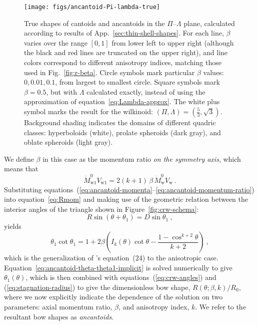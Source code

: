 \documentclass[useAMS, usenatbib, a4paper]{mnras}
\newcommand\w{\ensuremath{\mathrm{w}}}
\begin{document}
\begin{figure}
  \centering
  \texttt{[image: figs/ancantoid-Pi-lambda-true]}
  \caption[]{True shapes of cantoids and ancantoids in the
    \(\Pi\)--\(\Lambda\) plane, calculated according to results of
    App.~\ref{sec:thin-shell-shapes}.  For each line, \(\beta\) varies
    over the range \([0, 1]\) from lower left to upper right (although
    the black and red lines are truncated on the upper right), and
    line colors correspond to different anisotropy indices, matching
    those used in Fig.~\ref{fig:r-beta}. Circle symbols mark
    particular \(\beta\) values: \(0, 0.01, 0.1\), from largest to
    smallest circle.  Square symbols mark \(\beta = 0.5\), but with
    \(\Lambda\) calculated exactly, instead of using the approximation of
    equation~\eqref{eq:Lambda-approx}.  The white plus symbol marks
    the result for the wilkinoid:
    \((\Pi, \Lambda) = (\frac53, \sqrt{3})\).  Background shading indicates
    the domains of different quadric classes: hyperboloids (white),
    prolate spheroids (dark gray), and oblate spheroids (light gray).}
  \label{fig:ancantoid-Pi-lambda-true}
\end{figure}

We define \(\beta\) in this case as the momentum ratio \emph{on the symmetry axis}, which means that 
\begin{equation}
  \label{eq:ancantoid-momentum-ratio}
  \dot{M}^0_{\w{}1}V_{\w{}1} = 2 (k + 1)\, \beta\, \dot{M}^0_{\w} V_{\w} \ . 
\end{equation}
Substituting
equations~(\ref{eq:ancantoid-momenta}--\ref{eq:ancantoid-momentum-ratio})
into equation~\eqref{eq:Rmom} and making use of the geometric relation
between the interior angles of the triangle shown in
Figure~\ref{fig:crw-schema}:
\begin{equation}
  \label{eq:crw-angles}
  R \sin(\theta + \theta_1) = D \sin \theta_1 \ , 
\end{equation}
yields
\begin{equation}
  \label{eq:ancantoid-theta-theta1-implicit}
  \theta_1 \cot \theta_1 = 1 +
  2 \beta \left(
    I_k(\theta) \cot \theta
    - \frac{1 - \cos^{k+2} \theta} {k + 2} \right)   \ , 
\end{equation}
which is the generalization of \CRW{}'s equation~(24) to the
anisotropic case.  Equation~\eqref{eq:ancantoid-theta-theta1-implicit}
is solved numerically to give \(\theta_1(\theta)\), which is then combined with
equations~(\ref{eq:crw-angles}) and (\ref{eq:stagnation-radius}) to
give the dimensionless bow shape, \(R(\theta; \beta, k)/R_0\), where we now
explicitly indicate the dependence of the solution on two parameters:
axial momentum ratio, \(\beta\), and anisotropy index, \(k\).  We refer to
the resultant bow shapes as \textit{ancantoids}.
\end{document}

